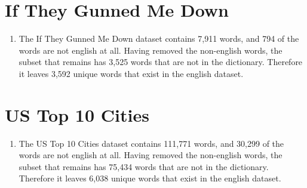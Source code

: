 \documentclass[11pt, oneside]{article}
\begin{document}
\section*{If They Gunned Me Down}

\begin{enumerate}
\item The If They Gunned Me Down dataset contains 7,911 words, and 794 of the words are not english at all. Having removed the non-english words, the subset that remains has 3,525 words that are not in the dictionary. Therefore it leaves 3,592 unique words that exist in the english dataset. 
\end{enumerate}

\section*{US Top 10 Cities}

\begin{enumerate}
\item The US Top 10 Cities dataset contains 111,771 words, and 30,299 of the words are not english at all. Having removed the non-english words, the subset that remains has 75,434 words that are not in the dictionary. Therefore it leaves 6,038 unique words that exist in the english dataset. 
\end{enumerate}
\end{document}
